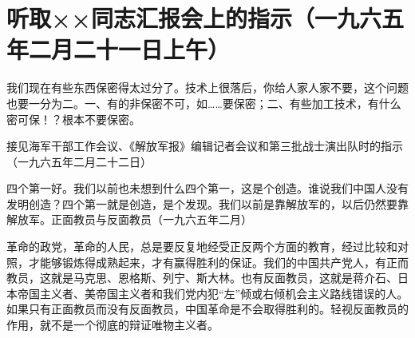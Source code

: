 \section[听取××同志汇报会上的指示（一九六五年二月二十一日上午）]{听取××同志汇报会上的指示（一九六五年二月二十一日上午）}


我们现在有些东西保密得太过分了。技术上很落后，你给人家人家不要，这个问题也要一分为二。一、有的非保密不可，如……要保密；二、有些加工技术，有什么密可保！？根本不要保密。

接见海军干部工作会议、《解放军报》编辑记者会议和第三批战士演出队时的指示（一九六五年二月二十二日）

四个第一好。我们以前也未想到什么四个第一，这是个创造。谁说我们中国人没有发明创造？四个第一就是创造，是个发现。我们以前是靠解放军的，以后仍然要靠解放军。正面教员与反面教员（一九六五年二月）

革命的政党，革命的人民，总是要反复地经受正反两个方面的教育，经过比较和对照，才能够锻炼得成熟起来，才有赢得胜利的保证。我们的中国共产党人，有正而教员，这就是马克思、恩格斯、列宁、斯大林。也有反面教员，这就是蒋介石、日本帝国主义者、美帝国主义者和我们党内犯“左”倾或右倾机会主义路线错误的人。如果只有正面教员而没有反面教员，中国革命是不会取得胜利的。轻视反面教员的作用，就不是一个彻底的辩证唯物主义者。



